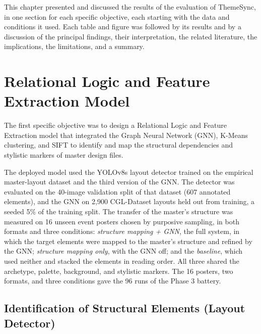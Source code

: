 \begin{refsection}
This chapter presented and discussed the results of the evaluation of ThemeSync, in one section for each specific objective, each starting with the data and conditions it used. Each table and figure was followed by its results and by a discussion of the principal findings, their interpretation, the related literature, the implications, the limitations, and a summary.

\section{Relational Logic and Feature Extraction Model}

The first specific objective was to design a Relational Logic and Feature Extraction model that integrated the Graph Neural Network (GNN), K-Means clustering, and SIFT to identify and map the structural dependencies and stylistic markers of master design files.

The deployed model used the YOLOv8s layout detector trained on the empirical master-layout dataset and the third version of the GNN. The detector was evaluated on the 40-image validation split of that dataset (607 annotated elements), and the GNN on 2,900 CGL-Dataset layouts held out from training, a seeded 5\% of the training split. The transfer of the master's structure was measured on 16 unseen event posters chosen by purposive sampling, in both formats and three conditions: \textit{structure mapping + GNN}, the full system, in which the target elements were mapped to the master's structure and refined by the GNN; \textit{structure mapping only}, with the GNN off; and the \textit{baseline}, which used neither and stacked the elements in reading order. All three shared the archetype, palette, background, and stylistic markers. The 16 posters, two formats, and three conditions gave the 96 runs of the Phase 3 battery.

\clearpage
\subsection{Identification of Structural Elements (Layout Detector)}


\end{refsection}
